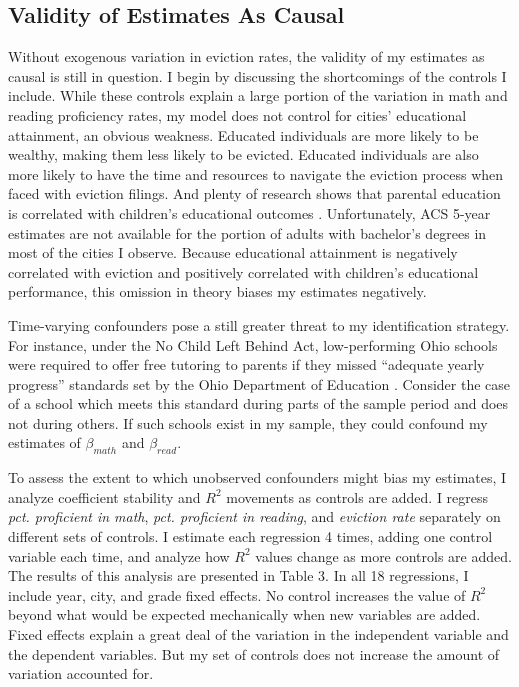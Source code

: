 \documentclass[12pt]{article}
\begin{document}
\subsection{Validity of Estimates As Causal}
Without exogenous variation in eviction rates, the validity of my estimates as causal is still in question. I begin by discussing the shortcomings of the controls I include. While these controls explain a large portion of the variation in math and reading proficiency rates, my model does not control for cities' educational attainment, an obvious weakness. Educated individuals are more likely to be wealthy, making them less likely to be evicted. Educated individuals are also more likely to have the time and resources to navigate the eviction process when faced with eviction filings. And plenty of research shows that parental education is correlated with children's educational outcomes \citep{tighe_influence_2021}. Unfortunately, ACS 5-year estimates are not available for the portion of adults with bachelor's degrees in most of the cities I observe. Because educational attainment is negatively correlated with eviction and positively correlated with children's educational performance, this omission in theory biases my estimates negatively. 


Time-varying confounders pose a still greater threat to my identification strategy. For instance, under the No Child Left Behind Act, low-performing Ohio schools were required to offer free tutoring to parents if they missed ``adequate yearly progress'' standards set by the Ohio Department of Education \citep{klein_no_2015}. Consider the case of a school which meets this standard during parts of the sample period and does not during others. If such schools exist in my sample, they could confound my estimates of $\beta_{math}$ and $\beta_{read}$.


To assess the extent to which unobserved confounders might bias my estimates, I analyze coefficient stability and $R^2$ movements as controls are added. I regress \emph{pct. proficient in math}, \emph{pct. proficient in reading}, and \emph{eviction rate} separately on different sets of controls. I estimate each regression 4 times, adding one control variable each time, and analyze how $R^2$ values change as more controls are added. The results of this analysis are presented in Table 3. In all 18 regressions, I include year, city, and grade fixed effects. No control increases the value of $R^2$ beyond what would be expected mechanically when new variables are added. Fixed effects explain a great deal of the variation in the independent variable and the dependent variables. But my set of controls does not increase the amount of variation accounted for.
\end{document}
